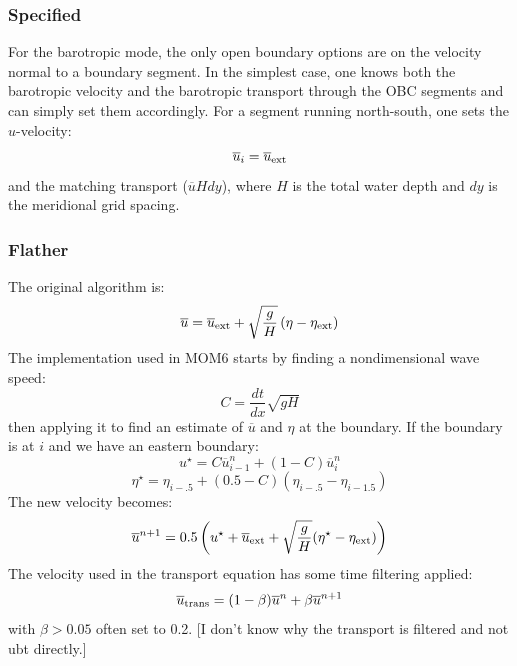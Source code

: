 \documentclass[11pt]{article}
\begin{document}
\subsubsection{Specified}
For the barotropic mode, the only open boundary options are on the
velocity normal to a boundary segment. In the simplest case, one
knows both the barotropic velocity and the barotropic transport
through the OBC segments and can simply set them accordingly.
For a segment running north-south, one sets the $u$-velocity:
\begin{equation}
  \overline{u}_{i} = \overline{u}_{\rm ext}
\end{equation}
and the matching transport ($\overline{u} H dy$),
where $H$ is the total water depth and $dy$ is the meridional grid
spacing.

\subsubsection{Flather}

The original \citet{Flather76} algorithm is:
\begin{equation}
  \overline{u} = \overline{u}_{\rm ext} + \sqrt{\frac{g}{H}} \,
    (\eta - \eta_{\rm ext})
\end{equation}
The implementation used in MOM6 starts by finding a nondimensional
wave speed:
\begin{equation}
  C = \frac{dt}{dx} \sqrt{gH}
\end{equation}
then applying it to find an estimate of $\overline{u}$ and $\eta$ at the boundary.
If the boundary is at $i$ and we have an eastern boundary:
\begin{equation}
  u^{\star} = C \overline{u}^n_{i-1} + (1-C)\overline{u}^n_i
\end{equation}
\begin{equation}
  \eta^{\star} = \eta_{i-.5} + (0.5-C)(\eta_{i-.5} - \eta_{i-1.5})
\end{equation}
The new velocity becomes:
\begin{equation}
  \overline{u}^{n+1} = 0.5 \left( u^{\star} + \overline{u}_{\rm ext} +
    \sqrt{\frac{g}{H}} (\eta^{\star} - \eta_{\rm ext}) \right)
\end{equation}
The velocity used in the transport equation has some time filtering applied:
\begin{equation}
  \overline{u}_{\rm trans} = (1 - \beta)\overline{u}^n + \beta \overline{u}^{n+1}
\end{equation}
with $\beta > 0.05$ often set to 0.2.
[I don't know why the transport is filtered and not ubt directly.]
\end{document}
